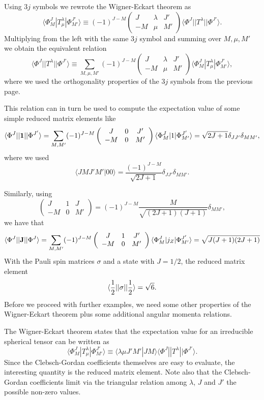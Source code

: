 {Using $3j$ symbols we rewrote the Wigner-Eckart theorem as
\[
\langle \Phi^J_M|T^{\lambda}_{\mu}|\Phi^{J'}_{M'}\rangle\equiv(-1)^{J-M}\left(\begin{array}{ccc}  J & \lambda & J' \\ -M & \mu & M'\end{array}\right)\langle \Phi^J||T^{\lambda}||\Phi^{J'}\rangle.
\]
Multiplying from the left with the same $3j$ symbol and summing over $M,\mu,M'$ we obtain the equivalent relation 
\[
\langle \Phi^J||T^{\lambda}||\Phi^{J'}\rangle\equiv\sum_{M,\mu,M'}(-1)^{J-M}\left(\begin{array}{ccc}  J & \lambda & J' \\ -M & \mu & M'\end{array}\right)\langle \Phi^J_M|T^{\lambda}_{\mu}|\Phi^{J'}_{M'}\rangle,
\]
where we used the orthogonality properties of the $3j$ symbols from the previous page.

This relation can in turn be used to compute the expectation value of some simple reduced matrix elements like
\[
\langle \Phi^J||{\bf 1}||\Phi^{J'}\rangle=\sum_{M,M'}(-1)^{J-M}\left(\begin{array}{ccc}  J & 0 & J' \\ -M & 0 & M'\end{array}\right)\langle \Phi^J_M|1|\Phi^{J'}_{M'}\rangle=\sqrt{2J+1}\delta_{JJ'}\delta_{MM'},
\]
where we used
\[
\langle JM J'M' |00\rangle =\frac{(-1)^{J-M}}{\sqrt{2J+1}}\delta_{JJ'}\delta_{MM'}.
\] 

Similarly, using 
\[
\left(\begin{array}{ccc}  J & 1 & J \\ -M & 0 & M'\end{array}\right)=(-1)^{J-M}\frac{M}{\sqrt{(2J+1)(J+1)}}\delta_{MM'},
\]
we have that 
\[
\langle \Phi^J||{\bf J}||\Phi^{J}\rangle=\sum_{M,M'}(-1)^{J-M}\left(\begin{array}{ccc}  J & 1 & J' \\ -M & 0 & M'\end{array}\right)\langle \Phi^J_M|j_Z|\Phi^{J'}_{M'}\rangle=\sqrt{J(J+1)(2J+1)}
\]
With the Pauli spin matrices $\sigma$ and a state with $J=1/2$, the reduced matrix element
\[
\langle \frac{1}{2}||{\bf \sigma}||\frac{1}{2}\rangle=\sqrt{6}.
\] 
Before we proceed with further examples, we need some other properties of the Wigner-Eckart theorem plus some additional angular momenta relations.

The Wigner-Eckart theorem states that the  expectation value for an irreducible spherical tensor can be written as
\[
\langle \Phi^J_M|T^{\lambda}_{\mu}|\Phi^{J'}_{M'}\rangle\equiv\langle \lambda \mu J'M'|JM\rangle\langle \Phi^J||T^{\lambda}||\Phi^{J'}\rangle.
\]
Since the Clebsch-Gordan coefficients themselves are easy to evaluate, the interesting quantity is the reduced matrix element. Note also that 
the Clebsch-Gordan coefficients limit via the triangular relation among $\lambda$, $J$ and $J'$ the possible non-zero values.

}
